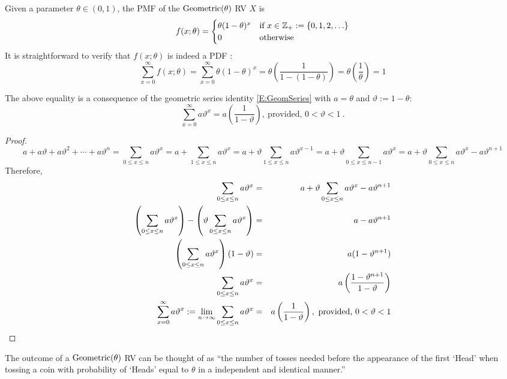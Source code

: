 \begin{model}
Given a parameter $\theta \in (0,1)$, the PMF of the $\mbox{{\rm Geometric}}(\theta)$ RV $X$ is
\begin{equation}\label{E:Geometricpdf}
f(x;\theta) =
\begin{cases}
\theta(1-\theta)^{x} & \text{if $x \in \mathbb{Z}_+ := \{0,1,2,\ldots \}$} \\
0 & \text{otherwise}
\end{cases}
\end{equation}
It is straightforward to verify that $f(x;\theta)$ is indeed a PDF :
\[
\sum_{x=0}^{\infty} f(x;\theta) = \sum_{x=0}^{\infty} \theta(1-\theta)^{x}
= \theta \left( \frac{1}{1-(1-\theta)} \right) =  \theta \left( \frac{1}{\theta} \right) = 1
\]

{\scriptsize
The above equality is a consequence of the geometric series identity \eqref{E:GeomSeries} with $a=\theta$ and $\vartheta:=1-\theta$:
\begin{equation}\label{E:GeomSeries}
 \sum_{ x =0}^{\infty} a \vartheta^x = a \left( \frac{1}{1-\vartheta} \right) , \ \text{provided, } 0 < \vartheta < 1 \ .
\end{equation}
\begin{proof}
\[
a+a\vartheta+a\vartheta^2+\cdots+a\vartheta^n
= \sum_{0 \leq x \leq n} a \vartheta^x
= a+ \sum_{1 \leq x \leq n} a \vartheta^x
= a +  \vartheta  \sum_{1 \leq x \leq n} a \vartheta^{x-1}
= a +  \vartheta  \sum_{0 \leq x \leq n-1} a \vartheta^{x}
= a +  \vartheta  \sum_{0 \leq x \leq n} a \vartheta^{x} - a \vartheta^{n+1}
\]
Therefore,
\begin{eqnarray}
\sum_{0 \leq x \leq n} a \vartheta^x
&=&  a +  \vartheta  \sum_{0 \leq x \leq n} a \vartheta^{x} - a \vartheta^{n+1} \notag \\
\left( \sum_{0 \leq x \leq n} a \vartheta^x \right) - \left( \vartheta  \sum_{0 \leq x \leq n} a \vartheta^{x} \right)
&=&  a  - a \vartheta^{n+1} \notag \\
\left( \sum_{0 \leq x \leq n} a \vartheta^x \right) (1-\vartheta)
&=&  a (1 -  \vartheta^{n+1}) \notag \\
\sum_{0 \leq x \leq n} a \vartheta^x
&=&  a \left( \frac{1 -  \vartheta^{n+1}}{1-\vartheta} \right) \notag\\
 \sum_{ x =0}^{\infty} a \vartheta^x  := \lim_{n \rightarrow \infty} \sum_{0 \leq x \leq n} a \vartheta^x
&=&  a \left( \frac{1}{1-\vartheta} \right) , \ \text{provided, } 0 < \vartheta < 1 \notag
\end{eqnarray}
\end{proof}
}
The outcome of a $\mbox{{\rm Geometric}}(\theta)$ RV can be thought of as ``the number of tosses needed before the appearance of the first `Head' when tossing a coin with probability of `Heads' equal to $\theta$ in a independent and identical manner.''
\end{model}

